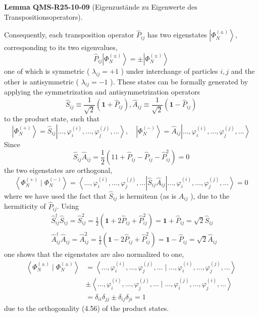 \documentclass[10pt, letterpaper]{article}
\newcommand{\CustomHeading}[3]{%
  \par\medskip\noindent%
  \textbf{#1 #2} \textnormal{(#3)}.\enskip%
}
\newenvironment{LEM}[2]{\begin{unitbox}\CustomHeading{Lemma}{#1}{#2}}{\end{unitbox}}
\begin{document}
\begin{LEM}{QMS-R25-10-09}{Eigenzustände zu Eigenwerte des Transpositionsoperators}
Consequently, each transposition operator $\hat{P}_{i j}$ has two eigenstates $\left|\Phi_{N}^{( \pm)}\right\rangle$, corresponding to its two eigenvalues,
$$
\hat{P}_{i j}\left|\Phi_{N}^{( \pm)}\right\rangle= \pm\left|\Phi_{N}^{( \pm)}\right\rangle
$$
one of which is symmetric ( $\lambda_{i j}=+1$ ) under interchange of particles $i, j$ and the other is antisymmetric ( $\lambda_{i j}=-1$ ). These states can be formally generated by applying the symmetrization and antisymmetrization operators
$$
\hat{S}_{i j} \equiv \frac{1}{\sqrt{2}}\left(\mathbf{1}+\hat{P}_{i j}\right), \hat{A}_{i j} \equiv \frac{1}{\sqrt{2}}\left(\mathbf{1}-\hat{P}_{i j}\right)
$$
to the product state, such that
$$
\left|\Phi_{N}^{(+)}\right\rangle=\hat{S}_{i j}\left|\ldots, \varphi_{i}^{(i)}, \ldots, \varphi_{j}^{(j)}, \ldots\right\rangle, \quad\left|\Phi_{N}^{(-)}\right\rangle=\hat{A}_{i j}\left|\ldots, \varphi_{i}^{(i)}, \ldots, \varphi_{j}^{(j)}, \ldots\right\rangle
$$
Since
$$
\hat{S}_{i j} \hat{A}_{i j}=\frac{1}{2}\left(11+\hat{P}_{i j}-\hat{P}_{i j}-\hat{P}_{i j}^{2}\right)=0
$$
the two eigenstates are orthogonal,
$$
\left\langle\Phi_{N}^{(+)} \mid \Phi_{N}^{(-)}\right\rangle=\left\langle\ldots, \varphi_{i}^{(i)}, \ldots, \varphi_{j}^{(j)}, \ldots\right| \hat{S}_{i j} \hat{A}_{i j}\left|\ldots, \varphi_{i}^{(i)}, \ldots, \varphi_{j}^{(j)}, \ldots\right\rangle=0
$$
where we have used the fact that $\hat{S}_{i j}$ is hermitean (as is $\hat{A}_{i j}$ ), due to the hermiticity of $\hat{P}_{i j}$. Using
$$
\begin{aligned}
& \hat{S}_{i j}^{\dagger} \hat{S}_{i j}=\hat{S}_{i j}^{2}=\frac{1}{2}\left(\mathbf{1}+2 \hat{P}_{i j}+\hat{P}_{i j}^{2}\right)=\mathbf{1}+\hat{P}_{i j}=\sqrt{2} \hat{S}_{i j} \\
& \hat{A}_{i j}^{\dagger} \hat{A}_{i j}=\hat{A}_{i j}^{2}=\frac{1}{2}\left(\mathbf{1}-2 \hat{P}_{i j}+\hat{P}_{i j}^{2}\right)=\mathbf{1}-\hat{P}_{i j}=\sqrt{2} \hat{A}_{i j}
\end{aligned}
$$
one shows that the eigenstates are also normalized to one,
$$
\begin{aligned}
\left\langle\Phi_{N}^{( \pm)} \mid \Phi_{N}^{( \pm)}\right\rangle & =\left\langle\ldots, \varphi_{i}^{(i)}, \ldots, \varphi_{j}^{(j)}, \ldots \mid \ldots, \varphi_{i}^{(i)}, \ldots, \varphi_{j}^{(j)}, \ldots\right\rangle \\
& \pm\left\langle\ldots, \varphi_{i}^{(i)}, \ldots, \varphi_{j}^{(j)}, \ldots \mid \ldots, \varphi_{i}^{(j)}, \ldots, \varphi_{j}^{(i)}, \ldots\right\rangle \\
& =\delta_{i i} \delta_{j j} \pm \delta_{i j} \delta_{j i}=1
\end{aligned}
$$
due to the orthogonality (4.56) of the product states.
\end{LEM}
\end{document}
